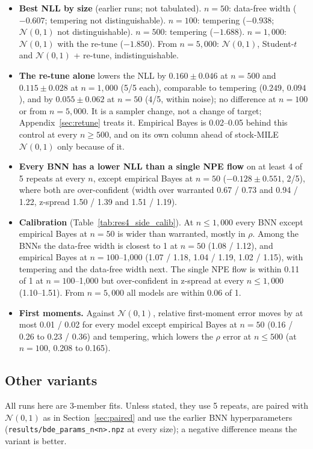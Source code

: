 \documentclass[11pt]{article}
\newcommand{\nzo}{\mathcal{N}(0,1)}
\newcommand{\code}[1]{\texttt{#1}}
\begin{document}
\begin{itemize}
\item \textbf{Best NLL by size} (earlier runs; not tabulated). $n=50$: data-free width ($-0.607$; tempering not
  distinguishable). $n=100$: tempering ($-0.938$; $\nzo$ not distinguishable). $n=500$: tempering ($-1.688$). $n=1{,}000$:
  $\nzo$ with the re-tune ($-1.850$). From $n=5{,}000$: $\nzo$, Student-$t$ and $\nzo$ + re-tune, indistinguishable.
\item \textbf{The re-tune alone} lowers the NLL by $0.160\pm0.046$ at $n=500$ and $0.115\pm0.028$ at $n=1{,}000$ (5/5 each),
  comparable to tempering ($0.249$, $0.094$), and by $0.055\pm0.062$ at $n=50$ (4/5, within noise); no difference at $n=100$
  or from $n=5{,}000$. It is a sampler change, not a change of target; Appendix~\ref{sec:retune} treats it. Empirical
  Bayes is 0.02--0.05 behind this control at every $n\ge500$, and on its own column ahead of stock-MILE $\nzo$ only
  because of it.
\item \textbf{Every BNN has a lower NLL than a single NPE flow} on at least 4 of 5 repeats at every $n$, except empirical Bayes at $n=50$
  ($-0.128\pm0.551$, 2/5), where both are over-confident (width over warranted 0.67 / 0.73 and 0.94 / 1.22, z-spread
  1.50 / 1.39 and 1.51 / 1.19).
\item \textbf{Calibration} (Table~\ref{tab:res4_side_calib}). At $n\le1{,}000$ every BNN except empirical Bayes at $n=50$ is
  wider than warranted, mostly in $\rho$. Among the BNNs the data-free width is closest to 1 at $n=50$ (1.08 / 1.12), and
  empirical Bayes at $n=100$--1{,}000 (1.07 / 1.18, 1.04 / 1.19, 1.02 / 1.15), with tempering and the data-free width next.
  The single NPE flow is within 0.11 of 1 at $n=100$--1{,}000 but over-confident in z-spread at every $n\le1{,}000$ (1.10--1.51). From
  $n=5{,}000$ all models are within 0.06 of 1.
\item \textbf{First moments.} Against $\nzo$, relative first-moment error moves by at most 0.01 / 0.02 for every model except
  empirical Bayes at $n=50$ (0.16 / 0.26 to 0.23 / 0.36) and tempering, which lowers the $\rho$ error at $n\le500$ (at
  $n=100$, 0.208 to 0.165).
\end{itemize}

\subsection{Other variants}
\label{sec:res_other}
\label{app:other}
All runs here are 3-member fits. Unless stated, they use 5 repeats, are paired with $\nzo$ as in Section~\ref{sec:paired}
and use the earlier BNN hyperparameters (\code{results/bde\_params\_n<n>.npz} at every size); a negative difference
means the variant is better.
\end{document}
